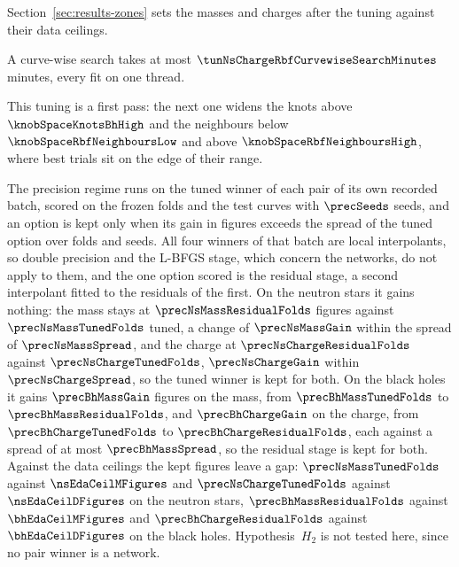 Section~\ref{sec:results-zones} sets the masses and charges after the tuning against their data ceilings.

A curve-wise search takes at most $\tunNsChargeRbfCurvewiseSearchMinutes$ minutes, every fit on one thread.

This tuning is a first pass: the next one widens the knots above $\knobSpaceKnotsBhHigh$ and the neighbours below $\knobSpaceRbfNeighboursLow$ and above $\knobSpaceRbfNeighboursHigh$, where best trials sit on the edge of their range.

\FloatBarrier

The precision regime runs on the tuned winner of each pair of its own recorded batch, scored on the frozen folds and the test curves with $\precSeeds$ seeds, and an option is kept only when its gain in figures exceeds the spread of the tuned option over folds and seeds. All four winners of that batch are local interpolants, so double precision and the L-BFGS stage, which concern the networks, do not apply to them, and the one option scored is the residual stage, a second interpolant fitted to the residuals of the first. On the neutron stars it gains nothing: the mass stays at $\precNsMassResidualFolds$ figures against $\precNsMassTunedFolds$ tuned, a change of $\precNsMassGain$ within the spread of $\precNsMassSpread$, and the charge at $\precNsChargeResidualFolds$ against $\precNsChargeTunedFolds$, $\precNsChargeGain$ within $\precNsChargeSpread$, so the tuned winner is kept for both. On the black holes it gains $\precBhMassGain$ figures on the mass, from $\precBhMassTunedFolds$ to $\precBhMassResidualFolds$, and $\precBhChargeGain$ on the charge, from $\precBhChargeTunedFolds$ to $\precBhChargeResidualFolds$, each against a spread of at most $\precBhMassSpread$, so the residual stage is kept for both. Against the data ceilings the kept figures leave a gap: $\precNsMassTunedFolds$ against $\nsEdaCeilMFigures$ and $\precNsChargeTunedFolds$ against $\nsEdaCeilDFigures$ on the neutron stars, $\precBhMassResidualFolds$ against $\bhEdaCeilMFigures$ and $\precBhChargeResidualFolds$ against $\bhEdaCeilDFigures$ on the black holes. Hypothesis~$H_2$ is not tested here, since no pair winner is a network.

